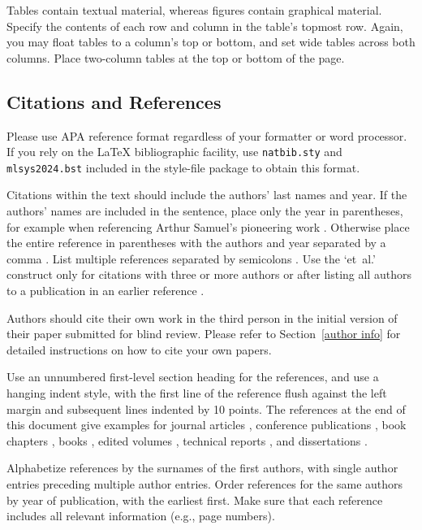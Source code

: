 \documentclass{article}
\begin{document}
Tables contain textual material, whereas figures contain graphical material.
Specify the contents of each row and column in the table's topmost
row. Again, you may float tables to a column's top or bottom, and set
wide tables across both columns. Place two-column tables at the
top or bottom of the page.

\subsection{Citations and References}

Please use APA reference format regardless of your formatter
or word processor. If you rely on the \LaTeX\/ bibliographic
facility, use \texttt{natbib.sty} and \texttt{mlsys2024.bst}
included in the style-file package to obtain this format.

Citations within the text should include the authors' last names and
year. If the authors' names are included in the sentence, place only
the year in parentheses, for example when referencing Arthur Samuel's
pioneering work . Otherwise place the entire
reference in parentheses with the authors and year separated by a
comma \cite{Samuel59}. List multiple references separated by
semicolons \cite{kearns89,Samuel59,mitchell80}. Use the `et~al.'
construct only for citations with three or more authors or after
listing all authors to a publication in an earlier reference \cite{MachineLearningI}.

Authors should cite their own work in the third person
in the initial version of their paper submitted for blind review.
Please refer to Section~\ref{author info} for detailed instructions on how to
cite your own papers.

Use an unnumbered first-level section heading for the references, and use a
hanging indent style, with the first line of the reference flush against the
left margin and subsequent lines indented by 10 points. The references at the
end of this document give examples for journal articles \cite{Samuel59},
conference publications \cite{langley00}, book chapters \cite{Newell81}, books
\cite{DudaHart2nd}, edited volumes \cite{MachineLearningI}, technical reports
\cite{mitchell80}, and dissertations \cite{kearns89}.

Alphabetize references by the surnames of the first authors, with
single author entries preceding multiple author entries. Order
references for the same authors by year of publication, with the
earliest first. Make sure that each reference includes all relevant
information (e.g., page numbers).
\end{document}
